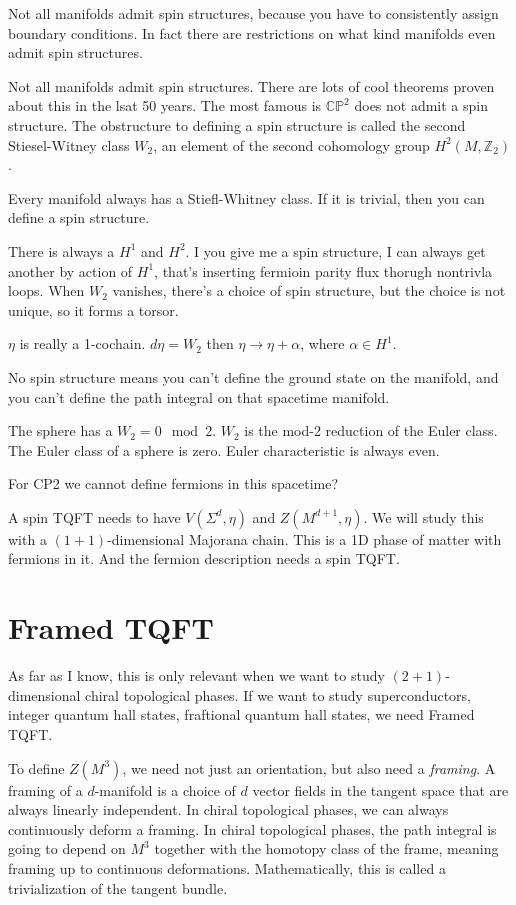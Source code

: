  Not all manifolds admit spin structures,
 because you have to consistently assign boundary conditions.
 In fact there are restrictions on what kind manifolds even admit spin
 structures.

 Not all manifolds admit spin structures.
 There are lots of cool theorems proven about this in the lsat 50 years.
 The most famous is $\mathbb{CP}^2$ does not admit a spin structure.
 The obstructure to defining a spin structure
 is called the second Stiesel-Witney class $W_2$,
 an element of the second cohomology group $H^2(M, \mathbb{Z}_2)$.

 Every manifold always has a Stiefl-Whitney class.
 If it is trivial,
 then you can define a spin structure.

 There is always a $H^1$ and $H^2$.
 I you give me a spin structure,
 I can always get another by action of $H^1$,
 that's inserting fermioin parity flux thorugh nontrivla loops.
 When $W_2$ vanishes,
 there's a choice of spin structure,
 but the choice is not unique,
 so it forms a torsor.

 $\eta$ is really a 1-cochain.
 $d\eta = W_2$ then $\eta\to \eta + \alpha$,
 where $\alpha\in H^1$.

No spin structure means you can't define the ground state on the manifold,
and you can't define the path integral on that spacetime manifold.

The sphere has a $W_2 = 0\mod 2$.
$W_2$ is the mod-2 reduction of the Euler class.
The Euler class of a sphere is zero.
Euler characteristic is always even.

\begin{question}
For CP2 we cannot define fermions in this spacetime?
\end{question}

A spin TQFT needs to have $V(\Sigma^d, \eta)$
and $Z(M^{d+1},\eta)$.
We will study this with a $(1+1)$-dimensional Majorana chain.
This is a 1D phase of matter with fermions in it.
And the fermion description needs a spin TQFT.

\section{Framed TQFT}
As far as I know,
this is only relevant when we want to study $(2+1)$-dimensional chiral
topological phases.
If we want to study superconductors, integer quantum hall states,
fraftional quantum hall states,
we need Framed TQFT.

To define $Z(M^3)$,
we need not just an orientation,
but also need a \emph{framing}.
A framing of a $d$-manifold is a choice of $d$ vector fields in the tangent
space that are always linearly independent.
In chiral topological phases,
we can always continuously deform a framing.
In chiral topological phases,
the path integral is going to depend on $M^3$
together with the homotopy class of the frame,
meaning framing up to continuous deformations.
Mathematically,
this is called a trivialization of the tangent bundle.

